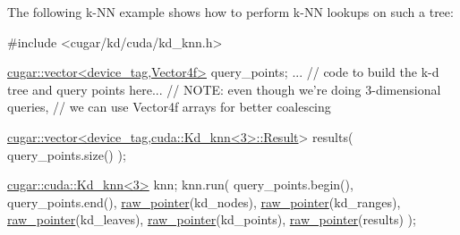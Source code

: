 \begin{DoxyParagraph}{}
The following k-\/\+NN example shows how to perform k-\/\+NN lookups on such a tree\+: 
\begin{DoxyCode}
\textcolor{preprocessor}{#include <cugar/kd/cuda/kd\_knn.h>}

\hyperlink{structcugar_1_1vector}{cugar::vector<device\_tag,Vector4f>} query\_points;
... \textcolor{comment}{// code to build the k-d tree and query points here...}
    \textcolor{comment}{// NOTE: even though we're doing 3-dimensional queries,}
    \textcolor{comment}{// we can use Vector4f arrays for better coalescing}

\hyperlink{structcugar_1_1vector}{cugar::vector<device\_tag,cuda::Kd\_knn<3>::Result}> results( 
      query\_points.size() );

\hyperlink{structcugar_1_1cuda_1_1_kd__knn}{cugar::cuda::Kd\_knn<3>} knn;
knn.run(
    query\_points.begin(),
    query\_points.end(),
    \hyperlink{namespacecugar_a3f6cb2c817f2ba065931cec569aa848b}{raw\_pointer}(kd\_nodes),
    \hyperlink{namespacecugar_a3f6cb2c817f2ba065931cec569aa848b}{raw\_pointer}(kd\_ranges),
    \hyperlink{namespacecugar_a3f6cb2c817f2ba065931cec569aa848b}{raw\_pointer}(kd\_leaves),
    \hyperlink{namespacecugar_a3f6cb2c817f2ba065931cec569aa848b}{raw\_pointer}(kd\_points),
    \hyperlink{namespacecugar_a3f6cb2c817f2ba065931cec569aa848b}{raw\_pointer}(results) );
\end{DoxyCode}
 
\end{DoxyParagraph}
